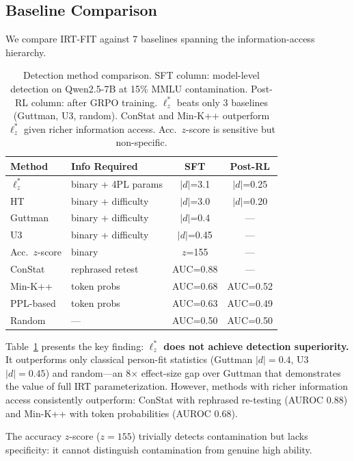 \documentclass[11pt,a4paper]{article}
\begin{document}
\subsection{Baseline Comparison}\label{sec:baselines}

We compare IRT-FIT against 7 baselines spanning the information-access hierarchy.

\begin{table}[t]
\centering
\small
\begin{tabular}{llcc}
\toprule
\textbf{Method} & \textbf{Info Required} & \textbf{SFT} & \textbf{Post-RL} \\
\midrule
$\ell_z^*$ & binary + 4PL params & $|d|$=3.1 & $|d|$=0.25 \\
HT & binary + difficulty & $|d|$=3.0 & $|d|$=0.20 \\
Guttman & binary + difficulty & $|d|$=0.4 & --- \\
U3 & binary + difficulty & $|d|$=0.45 & --- \\
Acc.\ $z$-score & binary & $z$=155 & --- \\
ConStat & rephrased retest & AUC=0.88 & --- \\
Min-K++ & token probs & AUC=0.68 & AUC=0.52 \\
PPL-based & token probs & AUC=0.63 & AUC=0.49 \\
Random & --- & AUC=0.50 & AUC=0.50 \\
\bottomrule
\end{tabular}
\caption{Detection method comparison. SFT column: model-level detection on Qwen2.5-7B at 15\% MMLU contamination. Post-RL column: after GRPO training. $\ell_z^*$ beats only 3 baselines (Guttman, U3, random). ConStat and Min-K++ outperform $\ell_z^*$ given richer information access. Acc.\ $z$-score is sensitive but non-specific.}
\label{tab:baselines}
\end{table}

Table~\ref{tab:baselines} presents the key finding: \textbf{$\ell_z^*$ does not achieve detection superiority.} It outperforms only classical person-fit statistics (Guttman $|d| = 0.4$, U3 $|d| = 0.45$) and random---an 8$\times$ effect-size gap over Guttman that demonstrates the value of full IRT parameterization. However, methods with richer information access consistently outperform: ConStat with rephrased re-testing (AUROC 0.88) and Min-K++ with token probabilities (AUROC 0.68).

The accuracy $z$-score ($z = 155$) trivially detects contamination but lacks specificity: it cannot distinguish contamination from genuine high ability.
\end{document}

